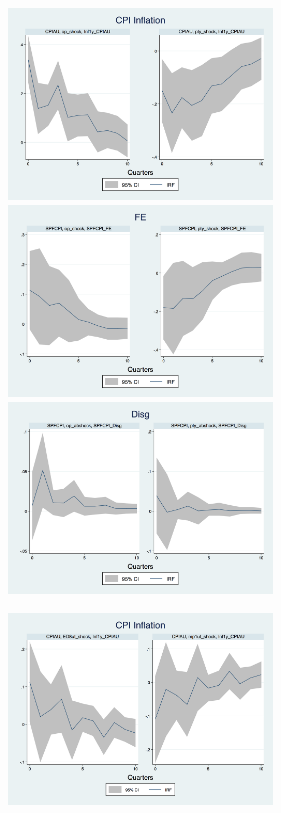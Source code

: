 \documentclass[]{article}
\begin{document}
	\begin{figure}[ht]
		\centering
		\begin{subfigure}[b]{0.5\textwidth}
		\includegraphics[width=7cm]{figures/CPIAU_ashocks_nmp_before2007.png}  
				\smallskip
			\includegraphics[width=7cm]{figures/SPFFE_ashocks_nmp_before2007.png} 
					\smallskip
				\includegraphics[width=7cm]{figures/SPFDisg_ab_ashocks_nmp_before2007.png} 
		\end{subfigure}	
	    \hfill 
	    \begin{subfigure}[b]{0.5\textwidth}
		\includegraphics[width=7cm]{figures/CPIAU_ashocks_before2007.png} 

\end{subfigure}
\end{figure}
\end{document}
